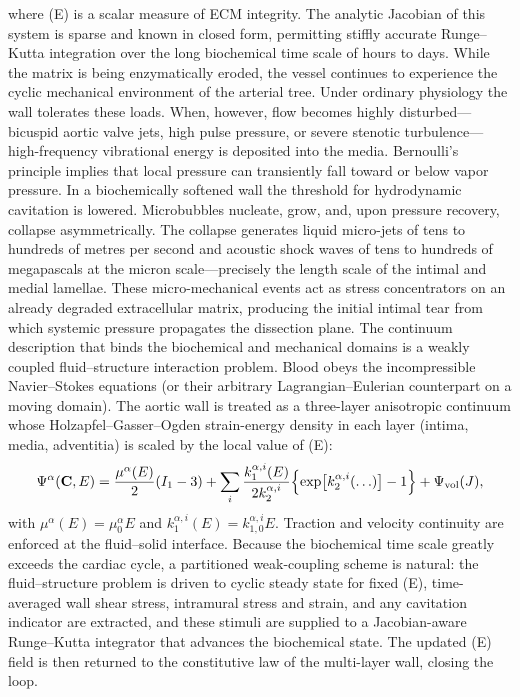 where (E) is a scalar measure of ECM integrity. The analytic Jacobian of this system is sparse and known in closed form, permitting stiffly accurate Runge–Kutta integration over the long biochemical time scale of hours to days.
While the matrix is being enzymatically eroded, the vessel continues to experience the cyclic mechanical environment of the arterial tree. Under ordinary physiology the wall tolerates these loads. When, however, flow becomes highly disturbed—bicuspid aortic valve jets, high pulse pressure, or severe stenotic turbulence—high-frequency vibrational energy is deposited into the media. Bernoulli’s principle implies that local pressure can transiently fall toward or below vapor pressure. In a biochemically softened wall the threshold for hydrodynamic cavitation is lowered. Microbubbles nucleate, grow, and, upon pressure recovery, collapse asymmetrically. The collapse generates liquid micro-jets of tens to hundreds of metres per second and acoustic shock waves of tens to hundreds of megapascals at the micron scale—precisely the length scale of the intimal and medial lamellae. These micro-mechanical events act as stress concentrators on an already degraded extracellular matrix, producing the initial intimal tear from which systemic pressure propagates the dissection plane.
The continuum description that binds the biochemical and mechanical domains is a weakly coupled fluid–structure interaction problem. Blood obeys the incompressible Navier–Stokes equations (or their arbitrary Lagrangian–Eulerian counterpart on a moving domain). The aortic wall is treated as a three-layer anisotropic continuum whose Holzapfel–Gasser–Ogden strain-energy density in each layer (intima, media, adventitia) is scaled by the local value of (E):
\[
\Psi^\alpha(\mathbf{C},E)=\frac{\mu^\alpha(E)}{2}(I_1-3)+\sum_i\frac{k_1^{\alpha,i}(E)}{2k_2^{\alpha,i}}\Bigl\{\exp\bigl[k_2^{\alpha,i}(\ldots)\bigr]-1\Bigr\}+\Psi_{\rm vol}(J),
\]
with \(\mu^\alpha(E)=\mu_0^\alpha E\) and \(k_1^{\alpha,i}(E)=k_{1,0}^{\alpha,i}E\). Traction and velocity continuity are enforced at the fluid–solid interface. Because the biochemical time scale greatly exceeds the cardiac cycle, a partitioned weak-coupling scheme is natural: the fluid–structure problem is driven to cyclic steady state for fixed (E), time-averaged wall shear stress, intramural stress and strain, and any cavitation indicator are extracted, and these stimuli are supplied to a Jacobian-aware Runge–Kutta integrator that advances the biochemical state. The updated (E) field is then returned to the constitutive law of the multi-layer wall, closing the loop.
